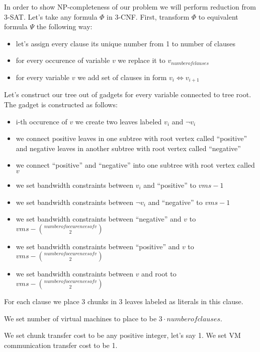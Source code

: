 In order to show NP-completeness of our problem we will perform
reduction from 3-SAT. Let's take any formula $\Phi$ in 3-CNF. First,
transform $\Phi$ to equivalent formula $\Psi$ the following way:

\begin{itemize}
\item let's assign every clause its unique number from 1 to number of
  clauses
\item for every occurence of variable $v$ we replace it to $v_{number
    of clauses}$
\item for every variable $v$ we add set of clauses in form $v_i \iff v_{i+1}$
\end{itemize}

Let's construct our tree out of gadgets for every variable connected
to tree root. The gadget is constructed as follows:

\begin{itemize}
\item i-th occurence of $v$ we create two leaves labeled $v_i$ and
  $\neg v_i$
\item we connect positive leaves in one subtree with root vertex called ``positive'' and negative leaves in
  another subtree with root vertex called ``negative''
\item we connect ``positive'' and ``negative'' into one subtree with
  root vertex called $v$
\item we set bandwidth constraints between $v_i$ and ``positive'' to
  $vms - 1$
\item we set bandwidth constraints between $\neg v_i$ and ``negative''
  to $vms - 1$
\item we set bandwidth constraints between ``negative'' and $v$ to
  $vms - \binom{number of occurences of v}{2}$
\item we set bandwidth constraints between ``positive'' and $v$ to
  $vms - \binom{number of occurences of v}{2}$
\item we set bandwidth constraints between $v$ and root to
  $vms - \binom{number of occurences of v}{2}$
\end{itemize}

For each clause we place 3 chunks in 3 leaves labeled as literals in
this clause.

We set number of virtual machines to place to be $3 \cdot number of
clauses$.

We set chunk transfer cost to be any positive integer, let's say 1.
We set VM communication transfer cost to be 1.

